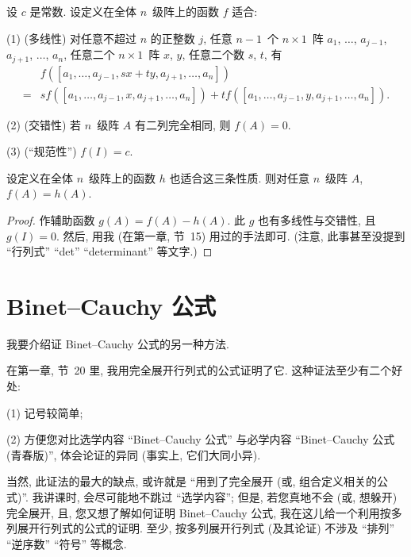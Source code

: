 \documentclass[%
    UTF8,%
    fontset=none,%
    punct=kaiming,%
    zihao=-4,%
    a4paper,%
    oneside,%
]{ctexbook}
\begin{document}
\begin{theorem}
    设 \(c\) 是常数.
    设定义在全体 \(n\)~级阵上的函数 \(f\) 适合:

    (1)
    (多线性)
    对任意不超过 \(n\) 的正整数 \(j\),
    任意 \(n-1\)~个 \(n \times 1\)~阵
    \(a_1\), \(\dots\), \(a_{j-1}\),
    \(a_{j+1}\), \(\dots\), \(a_n\),
    任意二个 \(n \times 1\)~阵 \(x\), \(y\),
    任意二个数 \(s\), \(t\),
    有
    \begin{align*}
             & f
            {([a_1, \dots, a_{j-1}, sx + ty,
                        a_{j+1}, \dots, a_n])}
        \\
        = {} &
        s
        f {([a_1, \dots, a_{j-1}, x, a_{j+1}, \dots, a_n])}
        +
        t
        f {([a_1, \dots, a_{j-1}, y, a_{j+1}, \dots, a_n])}.
    \end{align*}

    (2)
    (交错性)
    若 \(n\)~级阵 \(A\) 有二列完全相同,
    则 \(f {(A)} = 0\).

    (3)
    (``规范性'')
    \(f(I) = c\).

    设定义在全体 \(n\)~级阵上的函数 \(h\)
    也适合这三条性质.
    则对任意 \(n\)~级阵 \(A\), \(f(A) = h(A)\).
\end{theorem}

\begin{proof}
    作辅助函数 \(g(A) = f(A) - h(A)\).
    此 \(g\) 也有多线性与交错性,
    且 \(g(I) = 0\).
    然后, 用我 (在第一章, 节~15) 用过的手法即可.
    (注意, 此事甚至没提到 ``行列式''
    ``det'' ``determinant'' 等文字.)
\end{proof}

\section{Binet--Cauchy 公式}

我要介绍证 Binet--Cauchy 公式的另一种方法.

在第一章, 节~20 里, 我用完全展开行列式的公式证明了它.
这种证法至少有二个好处:

(1)
记号较简单;

(2)
方便您对比选学内容
``Binet--Cauchy 公式''
与必学内容
``Binet--Cauchy 公式 (青春版)'',
体会论证的异同
(事实上, 它们大同小异).

当然, 此证法的最大的缺点, 或许就是
``用到了完全展开
(或, 组合定义相关的公式)''.
我讲课时, 会尽可能地不跳过 ``选学内容'';
但是, 若您真地不会 (或, 想躲开) 完全展开,
且, 您又想了解如何证明 Binet--Cauchy 公式,
我在这儿给一个利用按多列展开行列式的公式的证明.
至少, 按多列展开行列式 (及其论证) 不涉及
``排列'' ``逆序数'' ``符号''
等概念.
\end{document}
